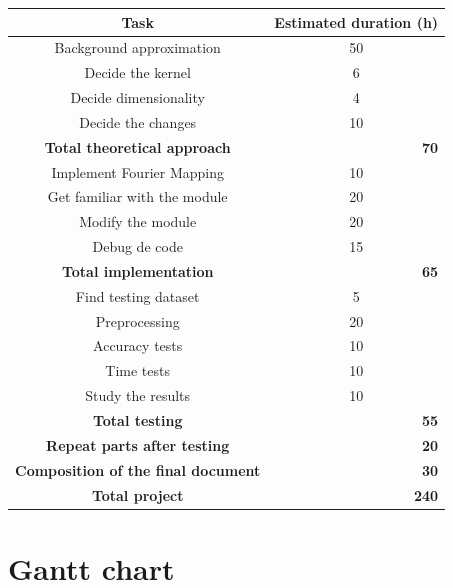 \documentclass[a4paper]{article}
\begin{document}
    \begin{center}
    \begin{tabular}{|c|c|}

        \hline
        \textbf{Task} & \textbf{Estimated duration (h)} \\
        \hline \hline
        Background approximation & 50 \\
        Decide the kernel & 6 \\
        Decide dimensionality & 4 \\
        Decide the changes & 10 \\
        \hline
        \textbf{Total theoretical approach} & \multicolumn{1}{|r|}{\textbf{70}} \\
        \hline
        Implement Fourier Mapping & 10 \\
        Get familiar with the module & 20 \\
        Modify the module & 20 \\
        Debug de code & 15 \\
        \hline
        \textbf{Total implementation} & \multicolumn{1}{|r|}{\textbf{65}} \\
        \hline
        Find testing dataset & 5 \\
        Preprocessing & 20 \\
        Accuracy tests & 10 \\
        Time tests & 10 \\
        Study the results & 10 \\
        \hline
        \textbf{Total testing} & \multicolumn{1}{|r|}{\textbf{55}} \\
        \hline
        \textbf{Repeat parts after testing} & \multicolumn{1}{|r|}{\textbf{20}} \\
        \hline
        \textbf{Composition of the final document} & \multicolumn{1}{|r|}{\textbf{30}} \\
        \hline
        \hline
        \textbf{Total project} & \multicolumn{1}{|r|}{\textbf{240}} \\
        \hline

    \end{tabular}
    \end{center}


    \section{Gantt chart}
\end{document}
